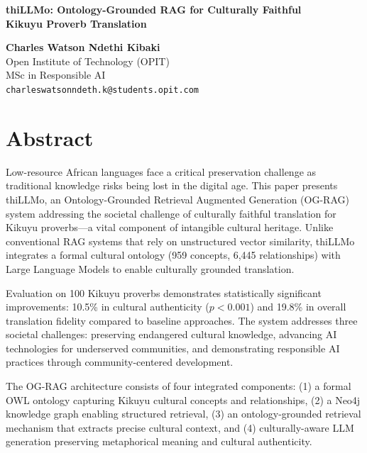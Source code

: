 \documentclass[11pt,a4paper]{article}
\begin{document}
\begin{center}
{\LARGE\bfseries thiLLMo: Ontology-Grounded RAG for Culturally Faithful\\Kikuyu Proverb Translation}
\end{center}

\vspace{5pt}

\begin{center}
\textbf{Charles Watson Ndethi Kibaki}\\
Open Institute of Technology (OPIT)\\
MSc in Responsible AI\\
\texttt{charleswatsonndeth.k@students.opit.com}
\end{center}

\vspace{10pt}

\section*{Abstract}

Low-resource African languages face a critical preservation challenge as traditional knowledge risks being lost in the digital age. This paper presents thiLLMo, an Ontology-Grounded Retrieval Augmented Generation (OG-RAG) system addressing the societal challenge of culturally faithful translation for Kikuyu proverbs---a vital component of intangible cultural heritage. Unlike conventional RAG systems that rely on unstructured vector similarity, thiLLMo integrates a formal cultural ontology (959 concepts, 6,445 relationships) with Large Language Models to enable culturally grounded translation.

Evaluation on 100 Kikuyu proverbs demonstrates statistically significant improvements: 10.5\% in cultural authenticity ($p < 0.001$) and 19.8\% in overall translation fidelity compared to baseline approaches. The system addresses three societal challenges: preserving endangered cultural knowledge, advancing AI technologies for underserved communities, and demonstrating responsible AI practices through community-centered development.

The OG-RAG architecture consists of four integrated components: (1) a formal OWL ontology capturing Kikuyu cultural concepts and relationships, (2) a Neo4j knowledge graph enabling structured retrieval, (3) an ontology-grounded retrieval mechanism that extracts precise cultural context, and (4) culturally-aware LLM generation preserving metaphorical meaning and cultural authenticity.
\end{document}
